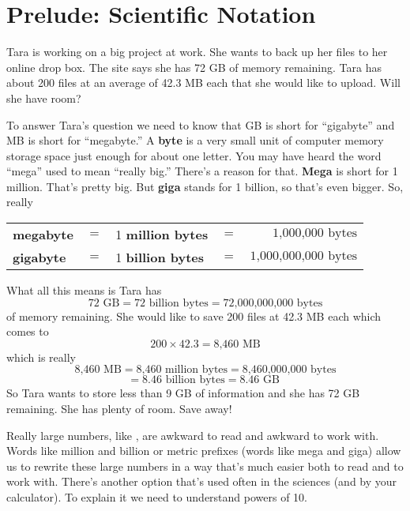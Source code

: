 \section{Prelude: Scientific Notation}

Tara is working on a big project at work.  She wants to back up her files to her online drop box. The site says she has 72 GB of memory remaining.  Tara has about 200 files at an average of 42.3 MB each that she would like to upload.  Will she have room?

To answer Tara's question we need to know that GB is short for ``gigabyte'' and MB is short for ``megabyte.''  A \textbf{byte} is a very small unit of computer memory storage space just enough for about one letter.  You may have heard the word ``mega'' used to mean ``really big.''  There's a reason for that.  \textbf{Mega} is short for 1 million.  That's pretty big.  But \textbf{giga} stands for 1 billion, so that's even bigger. So, really
\begin{center}
\begin{tabular} {lclcr} 
\textbf{megabyte} &$=$&1 \textbf{ million bytes} &$=$&$ \text{1,000,000 bytes}$\\
\textbf{gigabyte} &$=$& 1 \textbf{ billion bytes} &$=$& $\text{1,000,000,000 bytes}$\\ 
\end{tabular}
\end{center}

What all this means is Tara has
$$72\text{ GB} = 72 \text{ billion bytes} = \text{72,000,000,000 bytes}$$
of memory remaining.
She would like to save 200 files at 42.3 MB each which comes to
$$200 \times 42.3 = \text{8,460 MB}$$
which is really 
$$ \text{8,460 MB} = \text{8,460 million bytes} = \text{8,460,000,000} \text{ bytes}$$
$$= 8.46 \text{ billion bytes} = 8.46 \text{ GB }$$
So Tara wants to store less than 9 GB of information and she has 72 GB remaining.  She has plenty of room.  Save away!

Really large numbers, like , are awkward to read and awkward to work with.  Words like million and billion or metric prefixes (words like mega and giga)  allow us to rewrite these large numbers in a way that's much easier both to read and to work with.  There's another option that's used often in the sciences (and by your calculator).  To explain it we need to understand powers of 10.

